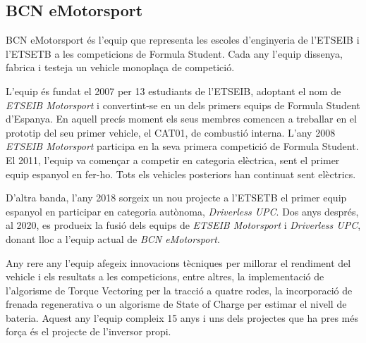 \subsection{ BCN eMotorsport }
{
    BCN eMotorsport és l'equip que representa les escoles d'enginyeria de
    l'\ac{ETSEIB} i l'\ac{ETSETB} a les competicions de Formula Student. Cada
    any l'equip dissenya, fabrica i testeja un vehicle monoplaça de competició.

    L'equip és fundat el 2007 per 13 estudiants de l'\ac{ETSEIB}, adoptant el
    nom de \emph{\ac{ETSEIB} Motorsport} i convertint-se en un dels primers
    equips de Formula Student d'Espanya. En aquell precís moment els seus
    membres comencen a treballar en el prototip del seu primer vehicle, el
    CAT01, de combustió interna. L'any 2008 \emph{\ac{ETSEIB} Motorsport}
    participa en la seva primera competició de Formula Student. El 2011,
    l'equip va començar a competir en categoria elèctrica, sent el primer equip
    espanyol en fer-ho. Tots els vehicles posteriors han continuat sent
    elèctrics.

    D'altra banda, l'any 2018 sorgeix un nou projecte a l'\ac{ETSETB} el primer
    equip espanyol en participar en categoria autònoma, \emph{Driverless UPC}.
    Dos anys després, al 2020, es produeix la fusió dels equips de
    \emph{\ac{ETSEIB} Motorsport} i \emph{Driverless UPC}, donant lloc a
    l'equip actual de \emph{BCN eMotorsport}. \cite{bcn_emotorsport}

    Any rere any l'equip afegeix innovacions tècniques per millorar el
    rendiment del vehicle i els resultats a les competicions, entre altres, la
    implementació de l'algorisme de Torque Vectoring per la tracció a quatre
    rodes, la incorporació de frenada regenerativa o un algorisme de State of
    Charge per estimar el nivell de bateria. Aquest any l'equip compleix 15
    anys i uns dels projectes que ha pres més força és el projecte de
    l'inversor propi.

}
